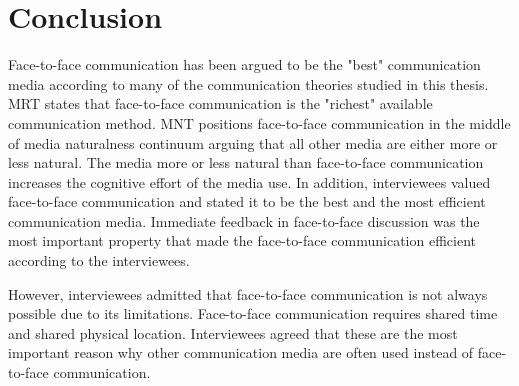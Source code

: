 \documentclass[english,12pt,a4paper,pdftex]{article}
\begin{document}

\clearpage

\section{Conclusion}
\label{sec:conclusion}
\acresetall

Face-to-face communication has been argued to be the "best" communication media according to many of the communication theories studied in this thesis. \Ac{MRT} states that face-to-face communication is the "richest" available communication method. \Ac{MNT} positions face-to-face communication in the middle of media naturalness continuum arguing that all other media are either more or less natural. The media more or less natural than face-to-face communication increases the cognitive effort of the media use. In addition, interviewees valued face-to-face communication and stated it to be the best and the most efficient communication media. Immediate feedback in face-to-face discussion was the most important property that made the face-to-face communication efficient according to the interviewees.

However, interviewees admitted that face-to-face communication is not always possible due to its limitations. Face-to-face communication requires shared time and shared physical location. Interviewees agreed that these are the most important reason why other communication media are often used instead of face-to-face communication.
\end{document}
